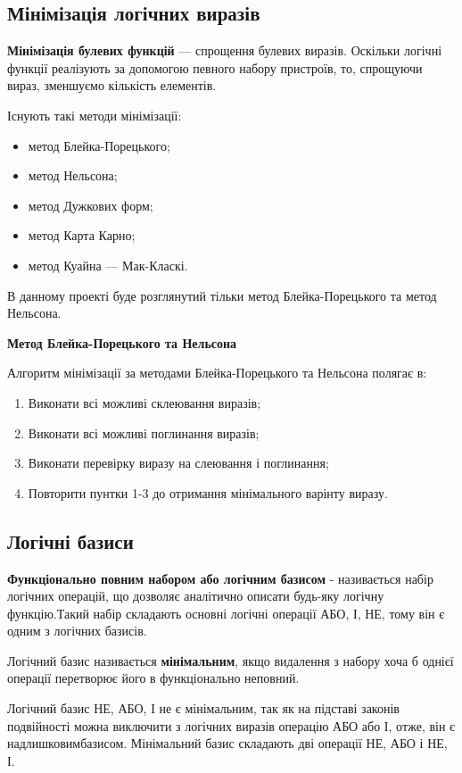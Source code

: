 \newpage
\subsection{Мінімізація логічних виразів}
\textbf{Мінімізація булевих функцій} — спрощення булевих виразів. Оскільки логічні функції реалізують за допомогою певного набору пристроїв, то, спрощуючи вираз, зменшуємо кількість елементів.

Існують такі методи мінімізації:
\begin{itemize}
	\item метод Блейка-Порецького;
	\item метод Нельсона;
	\item метод Дужкових форм;
	\item метод Карта Карно;
	\item метод Куайна — Мак-Класкі.
\end{itemize}

В данному проекті буде розглянутий тільки метод Блейка-Порецького та метод Нельсона.

\textbf{Метод Блейка-Порецького та Нельсона}

Алгоритм мінімізації за методами Блейка-Порецького та Нельсона полягає в:
\begin{enumerate}
\item Виконати всі можливі склеювання виразів;
\item Виконати всі можливі поглинання виразів;
\item Виконати перевірку виразу на слеювання і поглинання;
\item Повторити пунтки 1-3 до отримання мінімального варінту виразу.
\end{enumerate}

\newpage
\subsection{Логічні базиси}\label{subsect:logic_basis}
\textbf{Функціонально повним набором або логічним базисом} - називається набір логічних операцій, що дозволяє аналітично описати будь-яку логічну функцію.Такий набір складають основні логічні операції АБО, І, НЕ, тому він є одним з логічних базисів.

Логічний базис називається \textbf{мінімальним}, якщо видалення з набору хоча б однієї операції перетворює його в функціонально неповний.

 Логічний базис НЕ, АБО, І не є мінімальним, так як на підставі законів подвійності можна виключити з логічних виразів операцію АБО або І, отже, він є надлишковимбазисом. Мінімальний базис складають дві операції НЕ, АБО і НЕ, І. 
 

